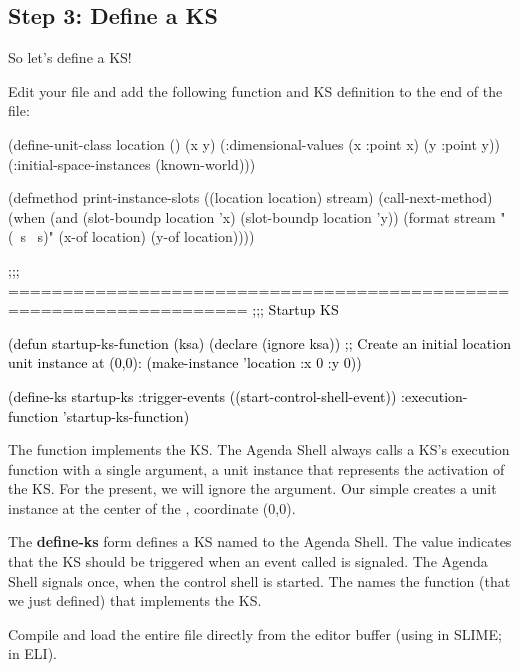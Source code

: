 \documentclass[10pt,twoside,english,pdftex]{article}
\begin{document}
\subsection*{Step 3: Define a KS}

So let's define a KS!

Edit your  file and add the following function
and KS definition to the end of the  file:
%
\W\supp
\begin{example}
\textcolor{darkergray}{%
  (define-unit-class location ()
    (x y)
    (:dimensional-values
      (x :point x)
      (y :point y))
    (:initial-space-instances (known-world)))

  (defmethod print-instance-slots ((location location) stream)
    (call-next-method)
    (when (and (slot-boundp location 'x)
               (slot-boundp location 'y))
      (format stream " (~s ~s)"
              (x-of location)
              (y-of location))))

  \textcolor{black}{;;; ====================================================================
  ;;;   Startup KS

  (defun startup-ks-function (ksa)
    (declare (ignore ksa))
    ;; Create an initial location unit instance at (0,0):
    (make-instance 'location :x 0 :y 0))

  (define-ks startup-ks
      :trigger-events ((start-control-shell-event))
      :execution-function 'startup-ks-function)}}
\end{example}

The function  implements the KS.  The Agenda Shell
always calls a KS's execution function with a single argument, a 
unit instance that represents the activation of the KS.  For the present, we
will ignore the  argument.  Our simple 
creates a  unit instance at the center of the
, coordinate (0,0).

The \textbf{define-ks} form defines a KS named  to the
Agenda Shell.  The  value indicates that the KS should
be triggered when an event called  is
signaled.  The Agenda Shell signals  once,
when the control shell is started.  The  names the
function (that we just defined) that implements the KS.

Compile and load the entire  file directly from
the editor buffer (using  in SLIME;  in ELI).
\end{document}
